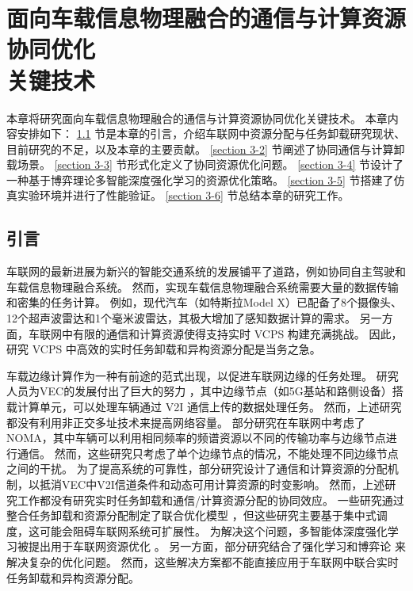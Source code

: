 \chapter[面向车载信息物理融合的通信与计算资源协同优化关键技术]{面向车载信息物理融合的通信与计算资源协同优化\\关键技术}
本章将研究面向车载信息物理融合的通信与计算资源协同优化关键技术。
本章内容安排如下：
\ref{section 3-1} 节是本章的引言，介绍车联网中资源分配与任务卸载研究现状、目前研究的不足，以及本章的主要贡献。
\ref{section 3-2} 节阐述了协同通信与计算卸载场景。
\ref{section 3-3} 节形式化定义了协同资源优化问题。
\ref{section 3-4} 节设计了一种基于博弈理论多智能深度强化学习的资源优化策略。
\ref{section 3-5} 节搭建了仿真实验环境并进行了性能验证。
\ref{section 3-6} 节总结本章的研究工作。

\section{引言}\label{section 3-1}

车联网的最新进展为新兴的智能交通系统的发展铺平了道路，例如协同自主驾驶\cite{bagheri20215g}和车载信息物理融合系统\cite{mugabarigira2023context}。
然而，实现车载信息物理融合系统需要大量的数据传输和密集的任务计算。
例如，现代汽车（如特斯拉Model X）已配备了8个摄像头、12个超声波雷达和1个毫米波雷达，其极大增加了感知数据计算的需求。
另一方面，车联网中有限的通信和计算资源使得支持实时 VCPS 构建充满挑战。
因此，研究 VCPS 中高效的实时任务卸载和异构资源分配是当务之急。

车载边缘计算\cite{lang2022cooperative}作为一种有前途的范式出现，以促进车联网边缘的任务处理。
研究人员为VEC的发展付出了巨大的努力 \cite{liu2021fog, dai2021edge, zhang2022digital, liu2020adaptive, liu2018coding}，其中边缘节点（如5G基站和路侧设备）搭载计算单元，可以处理车辆通过 V2I 通信上传的数据处理任务。
然而，上述研究都没有利用非正交多址\cite{islam2017power}技术来提高网络容量。
部分研究在车联网中考虑了NOMA\cite{patel2021performance, zhang2021centralized, zhu2021decentralized, liu2019energy}，其中车辆可以利用相同频率的频谱资源以不同的传输功率与边缘节点进行通信。
然而，这些研究只考虑了单个边缘节点的情况，不能处理不同边缘节点之间的干扰。
为了提高系统的可靠性，部分研究设计了通信和计算资源的分配机制，以抵消VEC中V2I信道条件和动态可用计算资源的时变影响\cite{liu2021rtds, liu2022a, chen2020robust, liu2014temporal, liu2016cooperative}。
然而，上述研究工作都没有研究实时任务卸载和通信/计算资源分配的协同效应。
一些研究通过整合任务卸载和资源分配制定了联合优化模型 \cite{dai2021asynchronous, dai2022a}，但这些研究主要基于集中式调度，这可能会阻碍车联网系统可扩展性。
为解决这个问题，多智能体深度强化学习\cite{kumar2022multi}被提出用于车联网资源优化 \cite{alam2022multi, zhang2021adaptive, nie2021semi}。
另一方面，部分研究结合了强化学习和博弈论 \cite{zheng2022stackelberg, albaba2021driver, rajeswaran2020a}来解决复杂的优化问题。
然而，这些解决方案都不能直接应用于车联网中联合实时任务卸载和异构资源分配。

